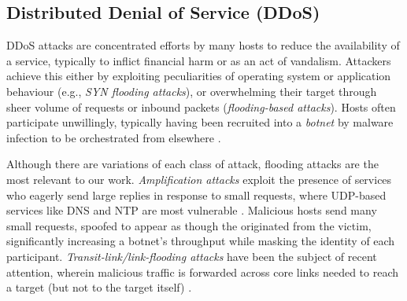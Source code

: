 \documentclass[conference, letterpaper, 10pt, times]{IEEEtran}
\begin{document}


\subsection{Distributed Denial of Service (DDoS)}


DDoS attacks are concentrated efforts by many hosts to reduce the availability of a service, typically to inflict financial harm or as an act of vandalism.
Attackers achieve this either by exploiting peculiarities of operating system or application behaviour (e.g., \emph{SYN flooding attacks}), or overwhelming their target through sheer volume of requests or inbound packets (\emph{flooding-based attacks}).
Hosts often participate unwillingly, typically having been recruited into a \emph{botnet} by malware infection to be orchestrated from elsewhere \cite{DBLP:conf/uss/AntonakakisABBB17}.

Although there are variations of each class of attack, flooding attacks are the most relevant to our work.
\emph{Amplification attacks} exploit the presence of services who eagerly send large replies in response to small requests, where UDP-based services like DNS and NTP are most vulnerable \cite{DBLP:conf/ndss/Rossow14, DBLP:conf/uss/KuhrerHRH14}.
Malicious hosts send many small requests, spoofed to appear as though the originated from the victim, significantly increasing a botnet's throughput while masking the identity of each participant.
\emph{Transit-link/link-flooding attacks} have been the subject of recent attention, wherein malicious traffic is forwarded across core links needed to reach a target (but not to the target itself) \cite{DBLP:conf/sp/KangLG13, DBLP:conf/esorics/StuderP09}.
\end{document}
